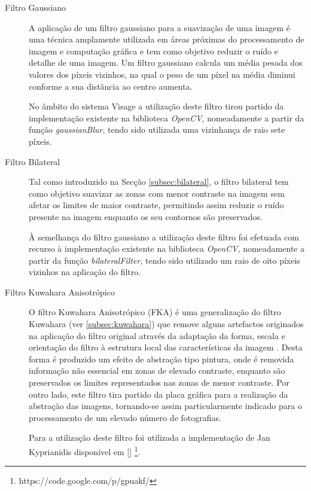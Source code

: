 \begin{description}
\item[Filtro Gaussiano]
A aplicação de um filtro gaussiano para a suavização de uma imagem é uma técnica amplamente utilizada em áreas próximas do processamento de imagem e computação gráfica e tem como objetivo reduzir o ruído e detalhe de uma imagem. Um filtro gaussiano calcula um média pesada dos valores dos píxeis vizinhos, na qual o peso de um píxel na média diminui conforme a sua distância ao centro aumenta.

No âmbito do sistema Visage a utilização deste filtro tirou partido da implementação existente na biblioteca \textit{OpenCV}, nomeadamente a partir da função \textit{gaussianBlur}, tendo sido utilizada uma vizinhança de raio sete píxeis.

\item[Filtro Bilateral]
Tal como introduzido na Secção \ref{subsec:bilateral}, o filtro bilateral tem como objetivo suavizar as zonas com menor contraste na imagem sem afetar os limites de maior contraste, permitindo assim reduzir o ruído presente na imagem enquanto os seu contornos são preservados.

À semelhança do filtro gaussiano a utilização deste filtro foi efetuada com recurso à implementação existente na biblioteca \textit{OpenCV}, nomeadamente a partir da função \textit{bilateralFilter}, tendo sido utilizado um raio de oito píxeis vizinhos na aplicação do filtro.

\item[Filtro Kuwahara Anisotrópico]
O filtro Kuwahara Anisotrópico (FKA) é uma generalização do filtro Kuwahara (ver \ref{subsec:kuwahara}) que remove alguns artefactos originados na aplicação do filtro original através da adaptação da forma, escala e orientação do filtro à estrutura local das características da imagem \cite{Kyprianidis2009}. Desta forma é produzido um efeito de abstração tipo pintura, onde é removida informação não essencial em zonas de elevado contraste, enquanto são preservados os limites representados nas zonas de menor contraste. Por outro lado, este filtro tira partido da placa gráfica para a realização da abstração das imagens, tornando-se assim particularmente indicado para o processamento de um elevado número de fotografias.

Para a utilização deste filtro foi utilizada a implementação de Jan Kyprianidis disponível em [] \footnote{https://code.google.com/p/gpuakf/}.

\end{description}
